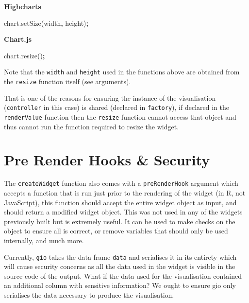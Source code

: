\documentclass[
]{krantz}
\makeatletter
\newenvironment{Shaded}{\begin{snugshade}}{\end{snugshade}}
\newcommand{\AttributeTok}[1]{\textcolor[rgb]{0.61,0.61,0.61}{#1}}
\newcommand{\NormalTok}[1]{#1}
\newcommand{\OperatorTok}[1]{\textcolor[rgb]{0.43,0.43,0.43}{\textbf{#1}}}
\newcommand{\VariableTok}[1]{\textcolor[rgb]{0,0,0}{#1}}
\newenvironment{kframe}{%
\medskip{}
\setlength{\fboxsep}{.8em}
 \def\at@end@of@kframe{}%
 \ifinner\ifhmode%
  \def\at@end@of@kframe{\end{minipage}}%
  \begin{minipage}{\columnwidth}%
 \fi\fi%
 \def\FrameCommand##1{\hskip\@totalleftmargin \hskip-\fboxsep
 \colorbox{shadecolor}{##1}\hskip-\fboxsep
     \hskip-\linewidth \hskip-\@totalleftmargin \hskip\columnwidth}%
 \MakeFramed {\advance\hsize-\width
   \@totalleftmargin\z@ \linewidth\hsize
   \@setminipage}}%
 {\par\unskip\endMakeFramed%
 \at@end@of@kframe}
\renewenvironment{Shaded}{\begin{kframe}}{\end{kframe}}
\makeatother
\begin{document}
\textbf{Highcharts}

\begin{Shaded}
\begin{Highlighting}[]
\VariableTok{chart}\NormalTok{.}\AttributeTok{setSize}\NormalTok{(width}\OperatorTok{,}\NormalTok{ height)}\OperatorTok{;}
\end{Highlighting}
\end{Shaded}

\textbf{Chart.js}

\begin{Shaded}
\begin{Highlighting}[]
\VariableTok{chart}\NormalTok{.}\AttributeTok{resize}\NormalTok{()}\OperatorTok{;}
\end{Highlighting}
\end{Shaded}

Note that the \texttt{width} and \texttt{height} used in the functions above are obtained from the \texttt{resize} function itself (see arguments).

That is one of the reasons for ensuring the instance of the visualisation (\texttt{controller} in this case) is shared (declared in \texttt{factory}), if declared in the \texttt{renderValue} function then the \texttt{resize} function cannot access that object and thus cannot run the function required to resize the widget.

\hypertarget{widgets-adv-prerender}{%
\section{Pre Render Hooks \& Security}\label{widgets-adv-prerender}}

The \texttt{createWidget} function also comes with a \texttt{preRenderHook} argument which accepts a function that is run just prior to the rendering of the widget (in R, not JavaScript), this function should accept the entire widget object as input, and should return a modified widget object. This was not used in any of the widgets previously built but is extremely useful. It can be used to make checks on the object to ensure all is correct, or remove variables that should only be used internally, and much more.

Currently, \texttt{gio} takes the data frame \texttt{data} and serialises it in its entirety which will cause security concerns as all the data used in the widget is visible in the source code of the output. What if the data used for the visualisation contained an additional column with sensitive information? We ought to ensure gio only serialises the data necessary to produce the visualisation.
\end{document}

